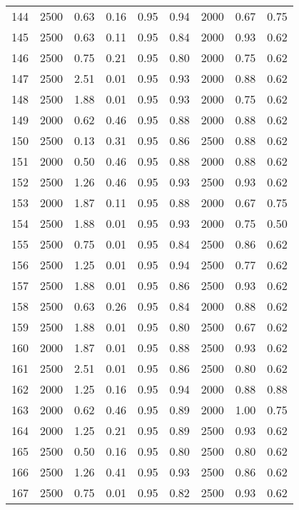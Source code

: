 \begin{longtable}[c]{ccccccccc}
144 &  2500 &  0.63 &  0.16 &  0.95 &  0.94 &  2000 &  0.67 &  0.75 \\
145 &  2500 &  0.63 &  0.11 &  0.95 &  0.84 &  2000 &  0.93 &  0.62 \\
146 &  2500 &  0.75 &  0.21 &  0.95 &  0.80 &  2000 &  0.75 &  0.62 \\
147 &  2500 &  2.51 &  0.01 &  0.95 &  0.93 &  2000 &  0.88 &  0.62 \\
148 &  2500 &  1.88 &  0.01 &  0.95 &  0.93 &  2000 &  0.75 &  0.62 \\
149 &  2000 &  0.62 &  0.46 &  0.95 &  0.88 &  2000 &  0.88 &  0.62 \\
150 &  2500 &  0.13 &  0.31 &  0.95 &  0.86 &  2500 &  0.88 &  0.62 \\
151 &  2000 &  0.50 &  0.46 &  0.95 &  0.88 &  2000 &  0.88 &  0.62 \\
152 &  2500 &  1.26 &  0.46 &  0.95 &  0.93 &  2500 &  0.93 &  0.62 \\
153 &  2000 &  1.87 &  0.11 &  0.95 &  0.88 &  2000 &  0.67 &  0.75 \\
154 &  2500 &  1.88 &  0.01 &  0.95 &  0.93 &  2000 &  0.75 &  0.50 \\
155 &  2500 &  0.75 &  0.01 &  0.95 &  0.84 &  2500 &  0.86 &  0.62 \\
156 &  2500 &  1.25 &  0.01 &  0.95 &  0.94 &  2500 &  0.77 &  0.62 \\
157 &  2500 &  1.88 &  0.01 &  0.95 &  0.86 &  2500 &  0.93 &  0.62 \\
158 &  2500 &  0.63 &  0.26 &  0.95 &  0.84 &  2000 &  0.88 &  0.62 \\
159 &  2500 &  1.88 &  0.01 &  0.95 &  0.80 &  2500 &  0.67 &  0.62 \\
160 &  2000 &  1.87 &  0.01 &  0.95 &  0.88 &  2500 &  0.93 &  0.62 \\
161 &  2500 &  2.51 &  0.01 &  0.95 &  0.86 &  2500 &  0.80 &  0.62 \\
162 &  2000 &  1.25 &  0.16 &  0.95 &  0.94 &  2000 &  0.88 &  0.88 \\
163 &  2000 &  0.62 &  0.46 &  0.95 &  0.89 &  2000 &  1.00 &  0.75 \\
164 &  2000 &  1.25 &  0.21 &  0.95 &  0.89 &  2500 &  0.93 &  0.62 \\
165 &  2500 &  0.50 &  0.16 &  0.95 &  0.80 &  2500 &  0.80 &  0.62 \\
166 &  2500 &  1.26 &  0.41 &  0.95 &  0.93 &  2500 &  0.86 &  0.62 \\
167 &  2500 &  0.75 &  0.01 &  0.95 &  0.82 &  2500 &  0.93 &  0.62 \\

\end{longtable}
